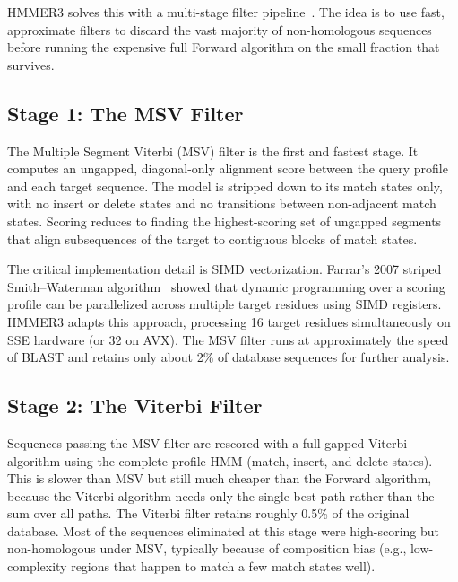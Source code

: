 HMMER3 solves this with a multi-stage filter pipeline~\cite{eddy2011}.
The idea is to use fast, approximate filters to discard the vast majority of non-homologous sequences before running the expensive full Forward algorithm on the small fraction that survives.

\subsection{Stage 1: The MSV Filter}
\label{sec:msv}

The Multiple Segment Viterbi (MSV) filter is the first and fastest stage.
It computes an ungapped, diagonal-only alignment score between the query profile and each target sequence.
The model is stripped down to its match states only, with no insert or delete states and no transitions between non-adjacent match states.
Scoring reduces to finding the highest-scoring set of ungapped segments that align subsequences of the target to contiguous blocks of match states.

The critical implementation detail is SIMD vectorization.
Farrar's 2007 striped Smith--Waterman algorithm~\cite{farrar2007} showed that dynamic programming over a scoring profile can be parallelized across multiple target residues using SIMD registers.
HMMER3 adapts this approach, processing 16 target residues simultaneously on SSE hardware (or 32 on AVX).
The MSV filter runs at approximately the speed of BLAST and retains only about 2\% of database sequences for further analysis.

\subsection{Stage 2: The Viterbi Filter}
\label{sec:viterbi-filter}

Sequences passing the MSV filter are rescored with a full gapped Viterbi algorithm using the complete profile HMM (match, insert, and delete states).
This is slower than MSV but still much cheaper than the Forward algorithm, because the Viterbi algorithm needs only the single best path rather than the sum over all paths.
The Viterbi filter retains roughly 0.5\% of the original database.
Most of the sequences eliminated at this stage were high-scoring but non-homologous under MSV, typically because of composition bias (e.g., low-complexity regions that happen to match a few match states well).

